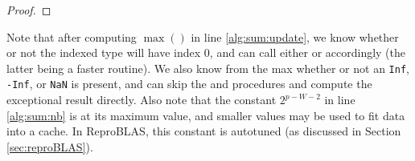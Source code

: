 \begin{proof}
\begin{comment}
      In either case, the ``Require'' clause of Algorithm \ref{alg:update} is satisfied. Therefore, after executing line \ref{alg:sum:update}, the following statements hold:
      \begin{enumerate}
      \item
        The index of $Y$ is $I$ where $I$ is the greatest integer such that $\max(|x_0|, ..., |x_{m - 1}|) < 2^{b_I}$
      \item
        $\mathcal{Y}_k = d(x_0, I + k) + ... + d(x_{j - 1}, I + k)$
      \item
        \Statex ${Y_k}_P \in [1.5  \epsilon^{-1} 2^{a_{I + k}}, 1.75  \epsilon^{-1} 2^{a_{I + k}})$ unless $I + k = 0$, in which case ${Y_0}_P \in (2^{e_{\max}}, 2 \cdot 2^{e_{\max}})$
      \end{enumerate}
      Between lines \ref{alg:sum:innerloop} and \ref{alg:sum:innerloopend}, at most $0.25\epsilon^{-1}2^{-W}$ calls to \ref{alg:sum:deposit} are made, and by Theorem \ref{thm:depositfreq}, and the above initial properties, the requirements of Algorithm \ref{alg:deposit} are met at each call. Therefore, after line \ref{alg:sum:innerloopend}, we have that $\mathcal{Y}_k = d(x_0, I + k) + ... + d(x_{j-1}, I + k)$.

      Again by Theorem \ref{thm:depositfreq}, the requirements of Algorithm \ref{alg:renorm} are met in line \ref{alg:sum:renorm}. Therefore, after execution of line \ref{alg:sum:renorm}, we have that ${Y_k}_P \in [1.5  \epsilon^{-1} 2^{a_{I + k}}, 1.75  \epsilon^{-1} 2^{a_{I + k}})$ unless $I + k = 0$, in which case ${Y_0}_P \in (1.5 \cdot 2^{e_{\max}}, 1.75 \cdot 2^{e_{\max}})$. Therefore, $Y$ is the indexed sum of $x_0, ..., x_{j - 1}$ after line \ref{alg:sum:renorm}, completing the induction.
      \end{comment}
    \end{proof}
    Note that after computing $\max()$ in line \ref{alg:sum:update}, we know whether or not the indexed type will have index 0, and can call either  or  accordingly (the latter being a faster routine). We also know from the max whether or not an \texttt{Inf}, \texttt{-Inf}, or \texttt{NaN} is present, and can skip the  and  procedures and compute the exceptional result directly. Also note that the constant $2^{p - W - 2}$ in line \ref{alg:sum:nb} is at its maximum value, and smaller values may be used to fit data into a cache. In ReproBLAS, this constant is autotuned (as discussed in Section \ref{sec:reproBLAS}).

